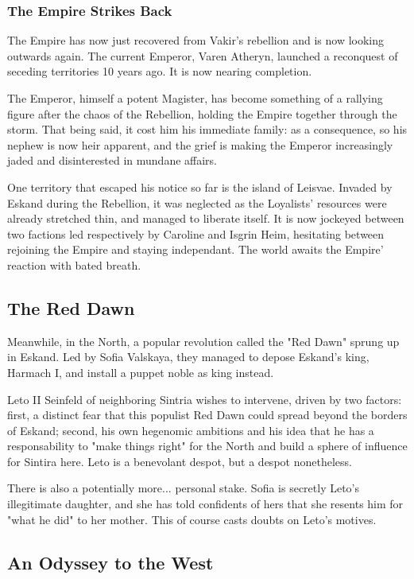 \subsubsection{The Empire Strikes Back}

The Empire has now just recovered from Vakir's rebellion and is now looking outwards again. The current Emperor, Varen Atheryn, launched a reconquest of seceding territories 10 years ago. It is now nearing completion.

The Emperor, himself a potent Magister, has become something of a rallying figure after the chaos of the Rebellion, holding the Empire together through the storm. That being said, it cost him his immediate family: as a consequence, so his nephew is now heir apparent, and the grief is making the Emperor increasingly jaded and disinterested in mundane affairs.

One territory that escaped his notice so far is the island of Leisvae. Invaded by Eskand during the Rebellion, it was neglected as the Loyalists' resources were already stretched thin, and managed to liberate itself. It is now jockeyed between two factions led respectively by Caroline and Isgrin Heim, hesitating between rejoining the Empire and staying independant. The world awaits the Empire' reaction with bated breath.

\subsection{The Red Dawn}

Meanwhile, in the North, a popular revolution called the "Red Dawn" sprung up in Eskand. Led by Sofia Valskaya, they managed to depose Eskand's king, Harmach I, and install a puppet noble as king instead. 

Leto II Seinfeld of neighboring Sintria wishes to intervene, driven by two factors: first, a distinct fear that this populist Red Dawn could spread beyond the borders of Eskand; second, his own hegenomic ambitions and his idea that he has a responsability to "make things right" for the North and build a sphere of influence for Sintira here. Leto is a benevolant despot, but a despot nonetheless.

There is also a potentially more... personal stake. Sofia is secretly Leto's illegitimate daughter, and she has told confidents of hers that she resents him for "what he did" to her mother. This of course casts doubts on Leto's motives. 


\subsection{An Odyssey to the West}
 
